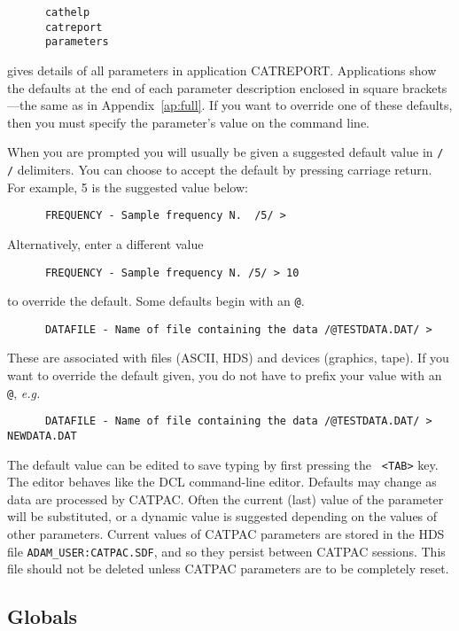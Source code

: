 \begin{verbatim}
      cathelp
      catreport
      parameters
\end{verbatim}

gives details of all parameters in application CATREPORT. Applications show the
defaults at the end of each  parameter description enclosed in square
brackets---the same as in Appendix~\ref{ap:full}. If you want to override one
of these defaults, then you must specify the parameter's value on the command
line. 

When you are prompted you will usually be given a suggested default value in
{\tt / /} delimiters.  You can choose to accept the default by pressing
carriage return.  For example, 5 is the suggested value below:

\begin{verbatim}
      FREQUENCY - Sample frequency N.  /5/ >
\end{verbatim}
Alternatively, enter a different value
\begin{verbatim}
      FREQUENCY - Sample frequency N. /5/ > 10
\end{verbatim}
to override the default. 
Some defaults begin with an {\tt @}.
\begin{verbatim}
      DATAFILE - Name of file containing the data /@TESTDATA.DAT/ > 
\end{verbatim}

These are associated with files (ASCII, HDS) and devices (graphics,
tape). If you want to override the default given, you do not have to
prefix your value with an {\tt @}, {\it e.g.}

\begin{verbatim}
      DATAFILE - Name of file containing the data /@TESTDATA.DAT/ > NEWDATA.DAT
\end{verbatim}

The default value can be edited to save typing by first pressing the {\tt
<TAB>} key. The editor behaves like the {\small DCL} command-line editor.
Defaults may change as data are processed by {\small CATPAC}. Often the current
(last) value of the parameter will be substituted, or a dynamic value is
suggested depending on the values of other parameters.  Current values of
CATPAC parameters are stored in the HDS file {\tt ADAM\_USER:CATPAC.SDF}, and
so they persist between {\small CATPAC} sessions. This file should not be
deleted unless {\small CATPAC} parameters are to be completely reset. 

\subsection{Globals}


